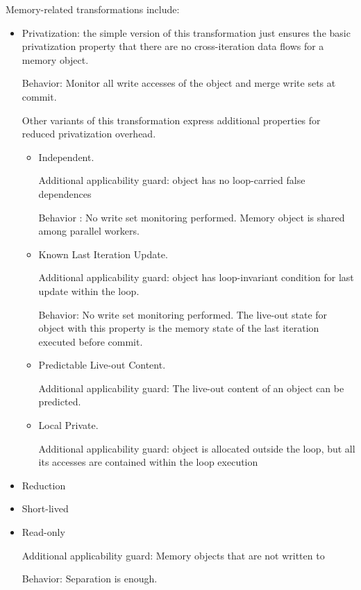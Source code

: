 Memory-related transformations include:
%
\begin{itemize}
%
\item Privatization: the simple version of this transformation just
ensures the basic privatization property that there are no
cross-iteration data flows for a memory object.

Behavior: Monitor all write accesses of the object and merge write
sets at commit.

Other variants of this transformation express additional properties for
reduced privatization overhead.
%
\begin{itemize}
%
\item Independent.

Additional applicability guard: object has no
loop-carried false dependences

Behavior : No write set monitoring performed. Memory object is shared among parallel workers.
%
%
\item Known Last Iteration Update.

Additional applicability guard:
object has loop-invariant condition for last update within the loop.

Behavior: No write set monitoring performed. The live-out state for
object with this property is the memory state of the last iteration
executed before commit.
%
%
\item Predictable Live-out Content.

Additional applicability guard:
The live-out content of an object can be predicted.
%
%
\item Local Private.

Additional applicability guard: object is
allocated outside the loop, but all its accesses are contained within
the loop execution
%
\end{itemize}

\item Reduction

\item Short-lived

\item Read-only

Additional applicability guard: Memory objects that are not written to

Behavior: Separation is enough.

\end{itemize}


